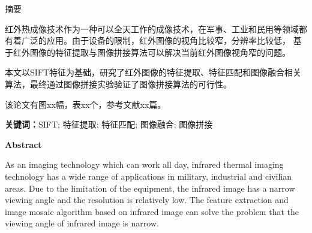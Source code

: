 \documentclass[10.5pt,a4paper]{article}
\numberwithin{equation}{section}
\numberwithin{figure}{section}
\numberwithin{table}{section}
\newcommand{\hei}{\CJKfamily{hei}}
\begin{document}
\newcommand\echapter[1]{\addengcontents{chapter}{#1}}
\newcommand\esection[1]{\addengcontents{section}{#1}}
\newcommand\esubsection[1]{\addengcontents{subsection}{#1}}
\newcommand\etitlesection[1]{{\noindent\bfseries\fontsize{18pt}{\baselineskip}\selectfont\noindent\thesection\hspace{1em}#1\par\vspace{1em}}}
\newcommand\etitlesubsection[1]{{\noindent\hei\fontsize{15pt}{\baselineskip}\selectfont\thesubsection\hspace{1em}#1\par\vspace{1em}}}
\newcommand\mmx{\mathrm{x}}
\setcounter{tocdepth}{2}
{}
{\centering \hei \fontsize{18pt}{\baselineskip}\selectfont 摘\qquad 要\par}
\vspace{1em}
\fontsize{12pt}{18pt}\selectfont
红外热成像技术作为一种可以全天工作的成像技术，在军事、工业和民用等领域都有着广泛的应用。由于设备的限制，红外图像的视角比较窄，分辨率比较低，%
基于红外图像的特征提取与图像拼接算法可以解决当前红外图像视角窄的问题。\par
本文以SIFT特征为基础，研究了红外图像的特征提取、特征匹配和图像融合相关算法，最终通过图像拼接实验验证了图像拼接算法的可行性。\par
\vspace{2em}
\par
该论文有图xx幅，表xx个，参考文献xx篇。
\par
\noindent \textbf{关键词：}SIFT; 特征提取; 特征匹配; 图像融合; 图像拼接
\par
\newpage %
{}
{\centering \hei \fontsize{18pt}{\baselineskip}\selectfont\bfseries \textsf{Abstract}\par}
\fontsize{12pt}{16pt}\selectfont
As an imaging technology which can work all day, infrared thermal imaging technology has a wide range of applications in military, industrial and civilian areas.
Due to the limitation of the equipment, the infrared image has a narrow viewing angle and the resolution is relatively low. The feature extraction and image mosaic algorithm based on infrared image can solve the problem that the viewing angle of infrared image is narrow.
\end{document}
